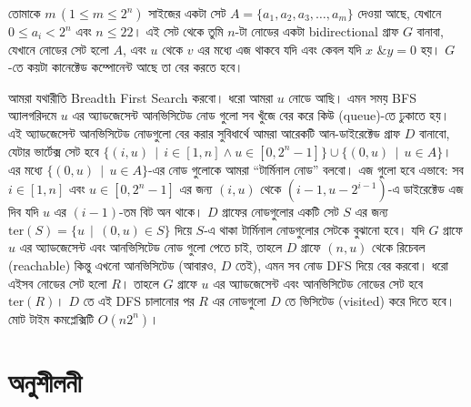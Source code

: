 \begin{example}
  তোমাকে $m \, (1 \le m \le 2^n)$ সাইজের একটা সেট $A=\{a_1, a_2, a_3, \ldots,
  a_m\}$ দেওয়া আছে, যেখানে $0 \le a_i < 2^n$ এবং $n \le 22$। এই সেট থেকে তুমি
  $n$-টা নোডের একটা bidirectional গ্রাফ $G$ বানাবা, যেখানে নোডের সেট হলো $A$,
  এবং $u$ থেকে $v$ এর মধ্যে এজ থাকবে যদি এবং কেবল যদি $x \texttt{ \& } y = 0$
  হয়। $G$-তে কয়টা কানেক্টেড কম্পোনেন্ট আছে তা বের করতে হবে।
\end{example}
\begin{solution}
  আমরা যথারীতি Breadth First Search করবো। ধরো আমরা $u$ নোডে আছি। এমন সময় BFS
  অ্যালগরিদমে $u$ এর অ্যাডজেসেন্ট আনভিসিটেড নোড গুলো সব খুঁজে বের করে কিউ
  (queue)-তে ঢুকাতে হয়। এই অ্যাডজেসেন্ট আনভিসিটেড নোডগুলো বের করার সুবিধার্থে
  আমরা আরেকটি আন-ডাইরেক্টেড গ্রাফ $D$ বানাবো, যেটার ভার্টেক্স সেট হবে $\{(i,
  u) \, \mid \, i \in [1, n] \land u \in [0, 2^n-1]\} \cup \{(0, u) \, \mid
  \, u \in A\}$। এর মধ্যে $\{(0, u) \, \mid \, u \in A\}$-এর নোড গুলোকে আমরা
  ``টার্মিনাল নোড'' বলবো। এজ গুলো হবে এভাবে: সব $i \in [1, n]$ এবং $u \in [0,
  2^n - 1]$ এর জন্য $(i, u)$ থেকে $(i-1, u - 2^{i-1})$-এ ডাইরেক্টেড এজ দিব
  যদি $u$ এর $(i-1)$-তম বিট অন থাকে। $D$ গ্রাফের নোডগুলোর একটি সেট $S$ এর
  জন্য $\text{ter}(S) = \{u \, \mid \, (0, u) \in S\}$ দিয়ে $S$-এ থাকা
  টার্মিনাল নোডগুলোর সেটকে বুঝানো হবে।
  যদি $G$ গ্রাফে $u$ এর অ্যাডজেসেন্ট এবং আনভিসিটেড নোড গুলো পেতে চাই, তাহলে
  $D$ গ্রাফে $(n, u)$ থেকে রিচেবল (reachable) কিন্তু এখনো আনভিসিটেড (আবারও,
  $D$ তেই), এমন সব নোড DFS দিয়ে বের করবো। ধরো এইসব নোডের সেট হলো $R$। তাহলে
  $G$ গ্রাফে $u$ এর অ্যাডজেসেন্ট এবং আনভিসিটেড নোডের সেট হবে $\text{ter}(R)$।
  $D$ তে এই DFS চালানোর পর $R$ এর নোডগুলো $D$ তে ভিসিটেড (visited) করে দিতে
  হবে। মোট টাইম কমপ্লেক্সিটি $O(n 2^n)$।
\end{solution}
\section{অনুশীলনী}

\begin{exercise}
  
\end{exercise}

\begin{exercise}

\end{exercise}

